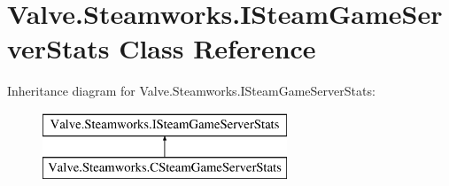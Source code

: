 \hypertarget{classValve_1_1Steamworks_1_1ISteamGameServerStats}{}\section{Valve.\+Steamworks.\+I\+Steam\+Game\+Server\+Stats Class Reference}
\label{classValve_1_1Steamworks_1_1ISteamGameServerStats}
Inheritance diagram for Valve.\+Steamworks.\+I\+Steam\+Game\+Server\+Stats\+:\begin{figure}[H]
\begin{center}
\leavevmode
\includegraphics[height=2.000000cm]{classValve_1_1Steamworks_1_1ISteamGameServerStats}
\end{center}
\end{figure}
